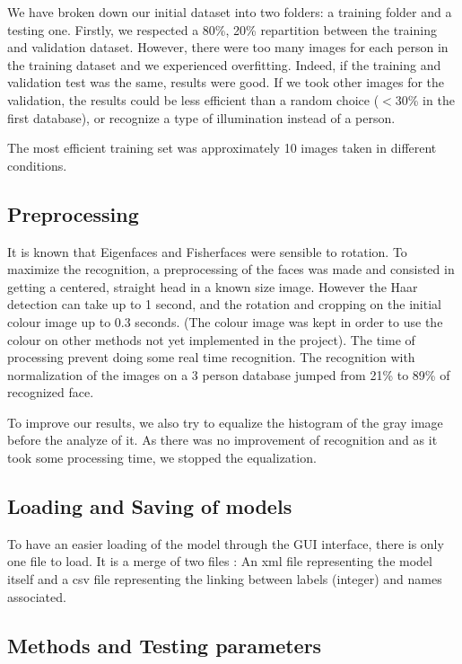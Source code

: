 We have broken down our initial dataset into two folders: a training folder and a testing one. Firstly, we respected a 80\%, 20\% repartition between the training and validation dataset. However, there were too many images for each person in the training dataset and we experienced overfitting. Indeed, if the training and validation test was the same, results were good. If we took other images for the validation, the results could be less efficient than a random choice ($<$30\% in the first database), or recognize a type of illumination instead of a person.

The most efficient training set was approximately 10 images taken in different conditions. 

\subsection{Preprocessing}
It is known that Eigenfaces and Fisherfaces were sensible to rotation. To maximize the recognition, a preprocessing of the faces was made and consisted in getting a centered, straight head in a known size image. However the Haar detection can take up to 1 second, and the rotation and cropping on the initial colour image up to 0.3 seconds. (The colour image was kept in order to use the colour on other methods not yet implemented in the project). The time of processing prevent doing some real time recognition. The recognition with normalization of the images on a 3 person database jumped from 21\% to 89\% of recognized face.

To improve our results, we also try to equalize the histogram of the gray image before the analyze of it. As there was no improvement of recognition and as it took some processing time, we stopped the equalization.

\subsection{Loading and Saving of models}
To have an easier loading of the model through the GUI interface, there is only one file to load. It is a merge of two files : An xml file representing the model itself and a csv file representing the linking between labels (integer) and names associated.


\subsection{Methods and Testing parameters}

